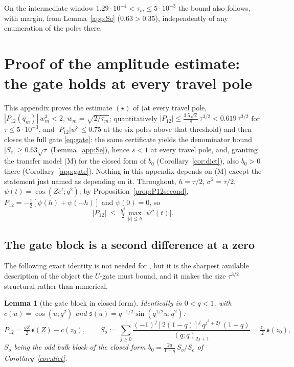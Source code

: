 \documentclass[11pt]{article}
\theoremstyle{plain}
\newtheorem{lemma}[theorem]{Lemma}
\theoremstyle{definition}
\theoremstyle{remark}
\begin{document}
\noindent On the intermediate window $1.29\cdot10^{-4}<\tau_m\le5\cdot10^{-3}$ the bound also
follows, with margin, from Lemma~\ref{app:Se} ($0.63>0.35$), independently of any enumeration of
the poles there.

\section{Proof of the amplitude estimate: the gate holds at every travel pole}\label{app:star}

This appendix proves the estimate $(\star)$ of {\cite[Theorem \textup{thm:U}]{Bonfioli2026bA}} (at every travel pole,
$|P_{12}(q_m)|\,w_m^3<2$, $w_m=\sqrt{2/\tau_m}$; quantitatively
$|P_{12}|\le\tfrac{3.5\sqrt2}8\,\tau^{3/2}<0.619\,\tau^{3/2}$ for $\tau\le5\cdot10^{-3}$, and
$|P_{12}|w^3\le0.75$ at the six poles above that threshold) and then closes the full gate
\eqref{eq:gate}: the same certificate yields the denominator bound $|S_e|\ge0.63\sqrt\tau$
(Lemma~\ref{app:Se}), hence $s<1$ at every travel pole, and, granting the transfer model
\textup{(M)} for the closed form of $b_0$ (Corollary~\ref{cor:dict}), also $b_0>0$ there
(Corollary~\ref{app:gate}). Nothing in this appendix depends on \textup{(M)} except the statement
just named as depending on it.
Throughout, $h=\tau/2$, $\sigma^2=\tau/2$, $\psi(t)=\cos(Ze^{t};q^2)$; by
Proposition~\ref{prop:P12second}, $P_{12}=-\tfrac12[\psi(h)+\psi(-h)]$ and $\psi(0)=0$, so
\begin{equation}\label{eq:taylorgate}
 |P_{12}|\;\le\;\tfrac{h^2}2\max_{|t|\le h}|\psi''(t)| .
\end{equation}

\subsection*{The gate block is a second difference at a zero}

The following exact identity is not needed for {\cite[Theorem \textup{thm:V}]{Bonfioli2026bA}}, but it is the sharpest
available description of the object the $U$-gate must bound, and it makes the size
$\tau^{3/2}$ structural rather than numerical.

\begin{lemma}[the gate block in closed form]\label{lem:P12closed}
Identically in $0<q<1$, with $c(u)=\cos(u;q^2)$ and $\mathfrak s(u)=q^{-1/2}\sin(q^{1/2}u;q^2)$:
\[
 P_{12}=\tfrac{qZ}2\,\mathfrak s(Z)-c(z_0),\qquad
 S_o:=\sum_{j\ge0}\frac{(-1)^j[2(1-q)]^j\,q^{j^2+2j}\,(1-q)}{(q;q)_{2j+1}}=\tfrac{z_0}2\,\mathfrak s(z_0),
\]
$S_o$ being the odd bulk block of the closed form $b_0=\tfrac{2q}{1-q}\,S_o/S_e$ of
Corollary~\ref{cor:dict}.
\end{lemma}
\end{document}
